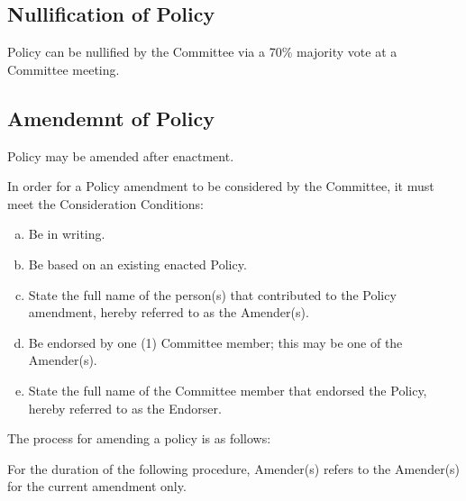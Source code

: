 \documentclass[a4paper,12pt]{article}
\begin{document}
\subsection{Nullification of Policy}
Policy can be nullified by the Committee via a 70\% majority vote at a Committee meeting.

\subsection{Amendemnt of Policy}
Policy may be amended after enactment.

In order for a Policy amendment to be considered by the Committee, it must meet the Consideration Conditions:

\begin{enumerate}[a)]
    \item Be in writing.
    \item Be based on an existing enacted Policy.
    \item State the full name of the person(s) that contributed to the Policy amendment, hereby referred to as the Amender(s).
    \item Be endorsed by one (1) Committee member; this may be one of the Amender(s).
    \item State the full name of the Committee member that endorsed the Policy, hereby referred to as the Endorser.    
\end{enumerate}

The process for amending a policy is as follows:

For the duration of the following procedure, Amender(s) refers to the Amender(s) for the current amendment only.
\end{document}
